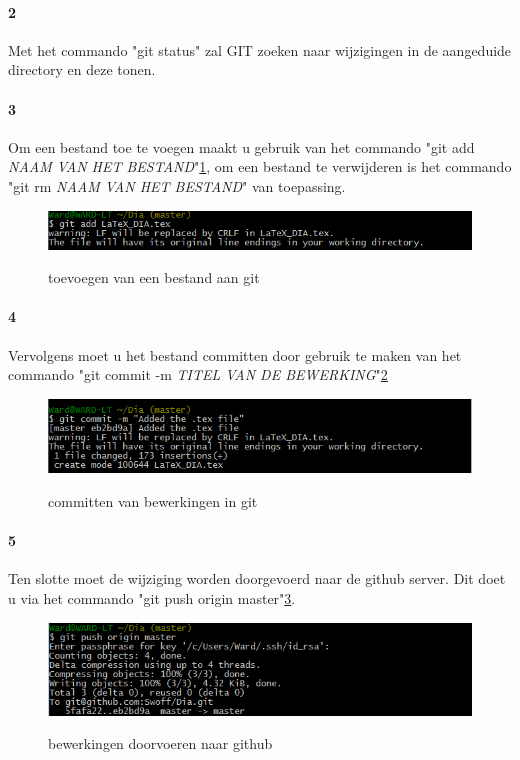 \documentclass[12pt,a4paper]{report}
\begin{document}
\begin{flushleft}
\paragraph*{2}
Met het commando "git status" zal GIT zoeken naar wijzigingen in de aangeduide directory en deze tonen.
\paragraph*{3}
Om een bestand toe te voegen maakt u gebruik van het commando "git add  \textit{NAAM VAN HET BESTAND}"\ref{git_01}, om een bestand te verwijderen is het commando "git rm \emph{NAAM VAN HET BESTAND}" van toepassing.
\begin{figure}[H]
\includegraphics[scale=0.75]{images/git_01.png}
\label{git_01}
\centering 
\vspace{-10pt}
\caption{toevoegen van een bestand aan git}
\end{figure} 
\paragraph*{4}
Vervolgens moet u het bestand committen door gebruik te maken van het commando "git commit  -m \textit{TITEL VAN DE BEWERKING}"\ref{git_02}
\begin{figure}[H]
\includegraphics[scale=0.75]{images/git_02.png}
\label{git_02}
\centering 
\vspace{-10pt}
\caption{committen van bewerkingen in git}
\end{figure}  
\paragraph*{5}
Ten slotte moet de wijziging worden doorgevoerd naar de github server. Dit doet u via het commando "git push origin master"\ref{git_03}.
\begin{figure}[H]
\includegraphics[scale=0.75]{images/git_03.png}
\label{git_03}
\centering 
\vspace{-10pt}
\caption{bewerkingen doorvoeren naar github}
\end{figure} 

\end{flushleft}
\end{document}
